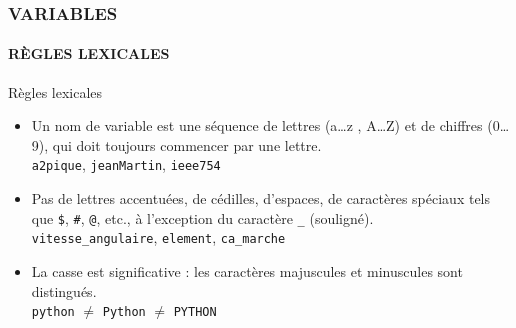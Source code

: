 \begin{frame}
\frametitle{\uppercase{Variables}}
\framesubtitle{\uppercase{Règles lexicales}}
\begin{block}{Règles lexicales}
\begin{itemize}
\item Un nom de variable est une séquence de lettres (a\ldots  z , A\ldots  Z) et de chiffres (0\ldots  9), 
	qui doit toujours commencer par une lettre.\\
	\alert{{\tt a2pique}}, \alert{{\tt jeanMartin}}, \alert{{\tt ieee754}}
\item Pas de lettres accentuées, de cédilles, d'espaces, de
      	caractères spéciaux tels que {\tt \$}, {\tt \#}, {\tt @}, etc., 
      	à l'exception du caractère {\tt \_} (souligné).\\
	\alert{{\tt vitesse\_angulaire}}, \alert{{\tt element}}, \alert{{\tt ca\_marche}}
\item La casse est significative : les caractères majuscules et minuscules sont distingués.\\
      	\alert{{\tt python}} $\neq$ \alert{{\tt Python}} $\neq$ \alert{{\tt PYTHON}}
\end{itemize}
\end{block}

\end{frame}
\note{}


